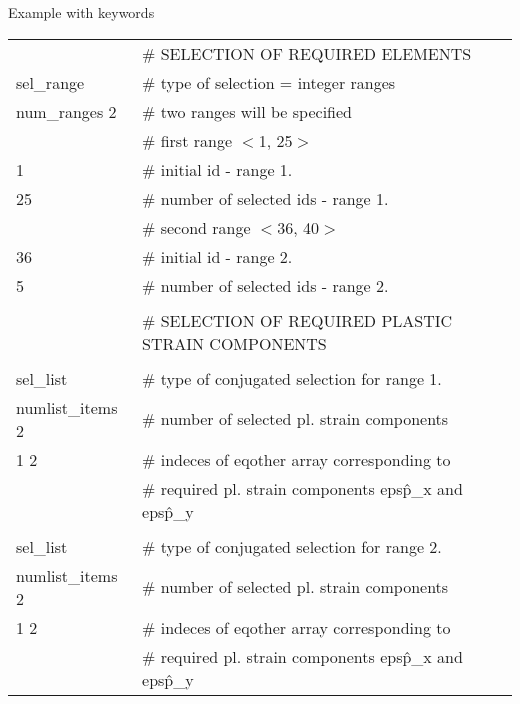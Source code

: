 \noindent Example with keywords
\begin{center}
\begin{tabular}{|ll|}
\hline
                 & \# SELECTION OF REQUIRED ELEMENTS                    \\
sel\_range       & \# type of selection = integer ranges                \\
num\_ranges 2    & \# two ranges will be specified                      \\
                 & \# first range $<$1, 25$>$                           \\
1                & \# initial id - range 1.                             \\
25               & \# number of selected ids - range 1.                 \\
                 & \# second range $<$36, 40$>$                         \\
36               & \# initial id - range 2.                             \\
5                & \# number of selected ids - range 2.                 \\
                 &                                                      \\
                 & \# SELECTION OF REQUIRED PLASTIC STRAIN COMPONENTS   \\
                 &                                                      \\
sel\_list        & \# type of conjugated selection for range 1.         \\
numlist\_items 2 & \# number of selected pl. strain components          \\
1 2              & \# indeces of eqother array corresponding to         \\
                 & \# required pl. strain components eps\^p\_x and eps\^p\_y\\      
                 &                                                      \\
sel\_list        & \# type of conjugated selection for range 2.         \\
numlist\_items 2 & \# number of selected pl. strain components          \\
1 2              & \# indeces of eqother array corresponding to         \\
                 & \# required pl. strain components eps\^p\_x and eps\^p\_y\\      
\hline
\end{tabular}\\
\end{center}




